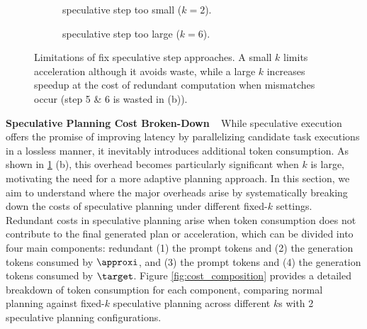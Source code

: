 \begin{figure}
    \centering
    \begin{subfigure}[b]{0.48\textwidth}
        \centering
        \resizebox{\linewidth}{!}{}
        \captionsetup{skip=2pt}
        \caption{speculative step too small ($k = 2$).}
    \end{subfigure}
    \hfill
    \begin{subfigure}[b]{0.46\textwidth}
        \centering
        \resizebox{\linewidth}{!}{}
        \captionsetup{skip=2pt}
        \caption{speculative step too large ($k = 6$).}
    \end{subfigure}
    \captionsetup{skip=2pt}
    \caption{Limitations of fix speculative step approaches. A small $k$ limits acceleration although it avoids waste, while a large $k$ increases speedup at the cost of redundant computation when mismatches occur (step 5 \& 6 is wasted in (b)).}
    \label{fig:motivation_k}
    \vspace{-5pt}
\end{figure}

\noindent \textbf{Speculative Planning Cost Broken-Down} ~
While speculative execution offers the promise of improving latency by parallelizing candidate task executions in a lossless manner, it inevitably introduces additional token consumption. As shown in \cref{fig:motivation_k} (b), this overhead becomes particularly significant when $k$ is large, motivating the need for a more adaptive planning approach. In this section, we aim to understand where the major overheads arise by systematically breaking down the costs of speculative planning under different fixed-$k$ settings. 
Redundant costs in speculative planning arise when token consumption does not contribute to the final generated plan or acceleration, which can be divided into four main components: redundant (1) the prompt tokens and (2) the generation tokens consumed by $\approxi$, and (3) the prompt tokens and (4) the generation tokens consumed by $\target$. Figure \ref{fig:cost_composition} provides a detailed breakdown of token consumption for each component, comparing normal planning against fixed-$k$ speculative planning across different $k$s with 2 speculative planning configurations.



